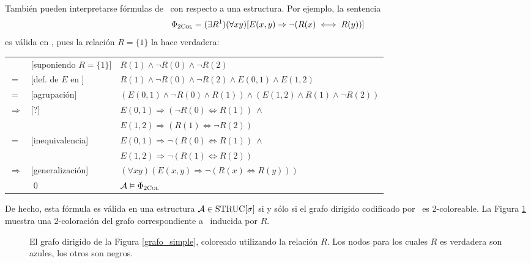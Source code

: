También pueden interpretarse fórmulas de \LSO \ con respecto a una estructura.
Por ejemplo, la sentencia
\[ \Phi_{\textsc{2Col}} = (\exists R^1)(\forall xy)[E(x,y)\Rightarrow \neg (R(x) \iff R(y))] \]
es válida en \A, pues la relación $R = \{1\}$ la hace verdadera:
\begin{center}
\begin{tabular}{lll}
&[suponiendo $R = \{1\}$] & $R(1) \land \neg R(0) \land \neg R(2)$\\
$=$ & [def. de $E$ en \A] & $R(1) \land \neg R(0) \land \neg R(2) \land 
E(0, 1) \land E(1, 2)$\\
$=$ & [agrupación] & $(E(0, 1) \land \neg R(0) \land R(1)) \land
(E(1, 2) \land R(1) \land \neg R(2))$\\
$\Rightarrow$ & [?] & $E(0, 1) \Rightarrow (\neg R(0) \iff R(1))\ \land$\\
&&$E(1, 2) \Rightarrow (R(1) \iff \neg R(2))$\\
$=$ & [inequivalencia] & $E(0, 1) \Rightarrow \neg(R(0) \iff R(1))\ \land$\\
&&$E(1, 2) \Rightarrow \neg(R(1) \iff R(2))$\\
$\Rightarrow$ & [generalización] & $(\forall xy)(E(x, y) \Rightarrow \neg(R(x) \iff R(y)))$\\
&\qed & $\mathcal{A} \vDash \Phi_{\textsc{2Col}}$
\end{tabular}
\end{center}
De hecho, esta fórmula es válida en una estructura $\mathcal{A} \in \text{STRUC}[\sigma]$ si y
sólo si el grafo dirigido codificado por \A \ es 2-coloreable. La Figura
\ref{grafo_coloreado} muestra una 2-coloración del grafo correspondiente a \A
\ inducida por $R$.

\begin{figure}[h]
\begin{center}
\end{center}
\caption{El grafo dirigido de la Figura \ref{grafo_simple}, coloreado
utilizando la relación $R$. Los nodos para los cuales $R$ es verdadera son
azules, los otros son negros.}
\label{grafo_coloreado}
\end{figure}

